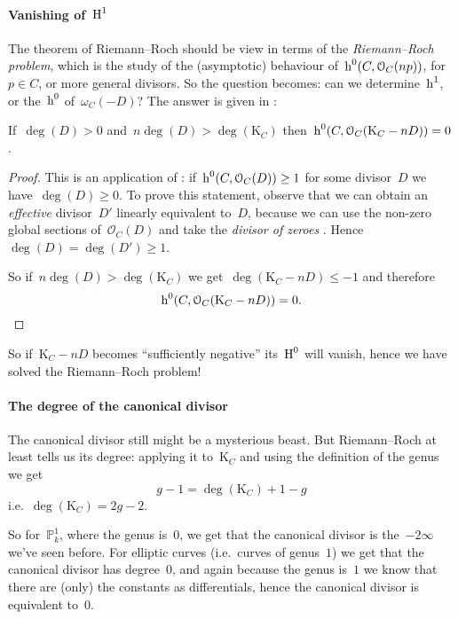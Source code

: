 \documentclass[10pt,a4paper]{article}
\begin{document}
\paragraph{Vanishing of~$\operatorname{H}^1$}
The theorem of Riemann--Roch should be view in terms of the \emph{Riemann--Roch problem}, which is the study of the (asymptotic) behaviour of~$\operatorname{h}^0(C,\mathcal{O}_C(np))$, for~$p\in C$, or more general divisors. So the question becomes: can we determine~$\operatorname{h}^1$, or the~$\operatorname{h}^0$ of~$\omega_C(-D)$? The answer is given in \cite[remark IV.1.3.2]{hartshorne-algebraic-geometry}:
\begin{lemma}
  If~$\deg(D)>0$ and~$n\deg(D)>\deg(\mathrm{K}_C)$ then~$\operatorname{h}^0(C,\mathcal{O}_C(\mathrm{K}_C-nD))=0$.

  \begin{proof}
    This is an application of \cite[lemma IV.1.2]{hartshorne-algebraic-geometry}: if~$\operatorname{h}^0(C,\mathcal{O}_C(D))\geq 1$ for some divisor~$D$ we have~$\deg(D)\geq 0$. To prove this statement, observe that we can obtain an \emph{effective} divisor~$D'$ linearly equivalent to~$D$, because we can use the non-zero global sections of~$\mathcal{O}_C(D)$ and take the \emph{divisor of zeroes} \cite[proposition II.7.7]{hartshorne-algebraic-geometry}. Hence~$\deg(D)=\deg(D')\geq 1$.

    So if~$n\deg(D)>\deg(\mathrm{K}_C)$ we get~$\deg(\mathrm{K}_C-nD)\leq -1$ and therefore
    \begin{equation}
      \operatorname{h}^0(C,\mathcal{O}_C(\mathrm{K}_C-nD))=0.
    \end{equation}
  \end{proof}
\end{lemma}
So if~$\mathrm{K}_C-nD$ becomes ``sufficiently negative'' its~$\operatorname{H}^0$ will vanish, hence we have solved the Riemann--Roch problem!

\paragraph{The degree of the canonical divisor}
The canonical divisor still might be a mysterious beast. But Riemann--Roch at least tells us its degree: applying it to~$\mathrm{K}_C$ and using the definition of the genus we get
\begin{equation}
  g-1=\deg(\mathrm{K}_C)+1-g
\end{equation}
i.e.\ $\deg(\mathrm{K}_C)=2g-2$.

So for~$\mathbb{P}_k^1$, where the genus is~$0$, we get that the canonical divisor is the~$-2\infty$ we've seen before. For elliptic curves (i.e.\ curves of genus~$1$) we get that the canonical divisor has degree~$0$, and again because the genus is~$1$ we know that there are (only) the constants as differentials, hence the canonical divisor is equivalent to~$0$.
\end{document}
